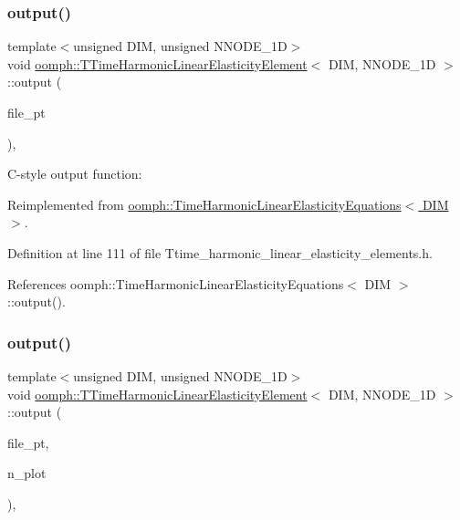 \subsubsection{\texorpdfstring{output()}{output()}\hspace{0.1cm}{\footnotesize\ttfamily [3/4]}}
{\footnotesize\ttfamily template$<$unsigned D\+IM, unsigned N\+N\+O\+D\+E\+\_\+1D$>$ \\
void \hyperlink{classoomph_1_1TTimeHarmonicLinearElasticityElement}{oomph\+::\+T\+Time\+Harmonic\+Linear\+Elasticity\+Element}$<$ D\+IM, N\+N\+O\+D\+E\+\_\+1D $>$\+::output (\begin{DoxyParamCaption}\item[{F\+I\+LE $\ast$}]{file\+\_\+pt }\end{DoxyParamCaption})\hspace{0.3cm}{\ttfamily [inline]}, {\ttfamily [virtual]}}



C-\/style output function\+: 



Reimplemented from \hyperlink{classoomph_1_1TimeHarmonicLinearElasticityEquations_ab92581333fed6fcfd5267e3136c445c3}{oomph\+::\+Time\+Harmonic\+Linear\+Elasticity\+Equations$<$ D\+I\+M $>$}.



Definition at line 111 of file Ttime\+\_\+harmonic\+\_\+linear\+\_\+elasticity\+\_\+elements.\+h.



References oomph\+::\+Time\+Harmonic\+Linear\+Elasticity\+Equations$<$ D\+I\+M $>$\+::output().

\mbox{\label{classoomph_1_1TTimeHarmonicLinearElasticityElement_af31e14a1ea8ce2e3a8a9ebd83403d566}} 
\subsubsection{\texorpdfstring{output()}{output()}\hspace{0.1cm}{\footnotesize\ttfamily [4/4]}}
{\footnotesize\ttfamily template$<$unsigned D\+IM, unsigned N\+N\+O\+D\+E\+\_\+1D$>$ \\
void \hyperlink{classoomph_1_1TTimeHarmonicLinearElasticityElement}{oomph\+::\+T\+Time\+Harmonic\+Linear\+Elasticity\+Element}$<$ D\+IM, N\+N\+O\+D\+E\+\_\+1D $>$\+::output (\begin{DoxyParamCaption}\item[{F\+I\+LE $\ast$}]{file\+\_\+pt,  }\item[{const unsigned \&}]{n\+\_\+plot }\end{DoxyParamCaption})\hspace{0.3cm}{\ttfamily [inline]}, {\ttfamily [virtual]}}



